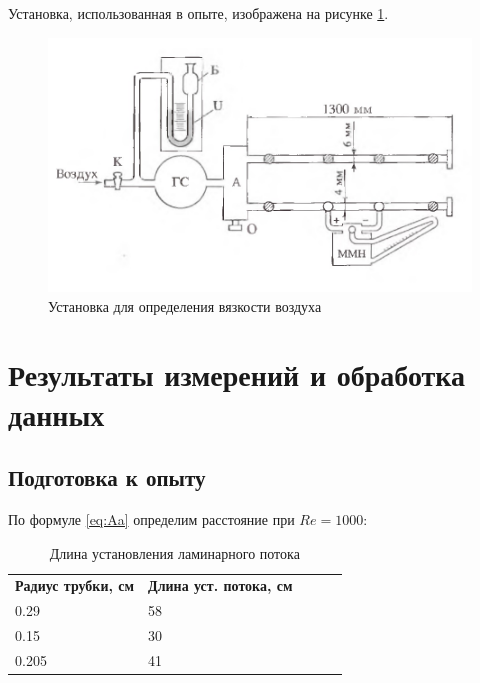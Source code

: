 \documentclass[a4paper]{article}
\begin{document}
Установка, использованная в опыте, изображена на рисунке \ref{fig:De}.
\begin{figure}[htbp]
	\includegraphics[scale=0.5]{1.jpg}
	\caption{Установка для определения вязкости воздуха}
	\label{fig:De}
\end{figure}

\section{Результаты измерений и обработка данных}
\subsection{Подготовка к опыту}
По формуле \ref{eq:Aa} определим расстояние при $Re = 1000$:
\begin{table}[htbp]
	\centering
		\begin{tabular}{|l|l|lll}
\cline{1-2}
\textbf{Радиус трубки, см} & \textbf{Длина уст. потока, см} &  &  &  \\ \cline{1-2}
0.29                       & 58                             &  &  &  \\ \cline{1-2}
0.15                       & 30                             &  &  &  \\ \cline{1-2}
0.205                      & 41                             &  &  &  \\ \cline{1-2}
\end{tabular}
	\caption{Длина установления ламинарного потока}
	\label{tab:Le}
\end{table}
\end{document}
